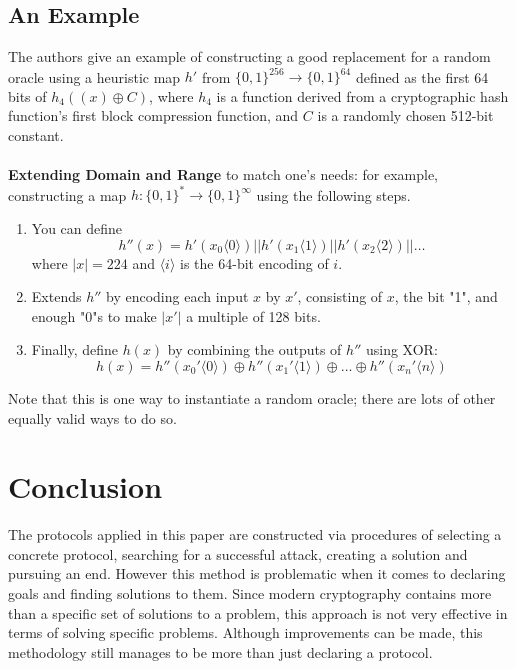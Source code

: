 \documentclass{article}
\begin{document}
\subsection{An Example}
The authors give an example of constructing a good replacement for a random oracle using a heuristic map $h'$ from $\{0, 1\}^{256} \rightarrow \{0, 1\}^{64}$ defined as the first 64 bits of $h_4((x) \oplus C)$, where $h_4$ is a function derived from a cryptographic hash function's first block compression function, and $C$ is a randomly chosen 512-bit constant.
\\\\
\textbf{Extending Domain and Range} to match one's needs: for example,
constructing a map $h: \{0, 1\}^* \rightarrow \{0, 1\}^\infty$ using the following steps.
\begin{enumerate}
    \item You can define 
   $$
   h''(x) = h'(x_0\langle 0\rangle) || h'(x_1\langle 1\rangle) || h'(x_2\langle 2\rangle) || \ldots
   $$
   where $|x| = 224$ and $\langle i\rangle$ is the 64-bit encoding of $i$.
   \item Extends $h''$ by encoding each input $x$ by $x'$, consisting of $x$, the bit "1", and enough "0"s to make $|x'|$ a multiple of 128 bits.
   \item Finally, define $h(x)$ by combining the outputs of $h''$ using XOR:
$$
h(x) = h''(x_0'\langle 0\rangle) \oplus h''(x_1'\langle 1\rangle) \oplus \ldots \oplus h''(x_n'\langle n\rangle)
$$
\end{enumerate}
Note that this is one way to instantiate a random oracle; there are lots of other equally valid ways to do so.

\section{Conclusion}

The protocols applied in this paper are constructed via procedures of selecting a concrete protocol, searching for a successful attack, creating a solution and pursuing an end. However this method is problematic when it comes to declaring goals and finding solutions to them. Since modern cryptography contains more than a specific set of solutions to a problem, this approach is not very effective in terms of solving specific problems. Although improvements can be made, this methodology still manages to be more than just declaring a protocol. 







\newpage


\end{document}
